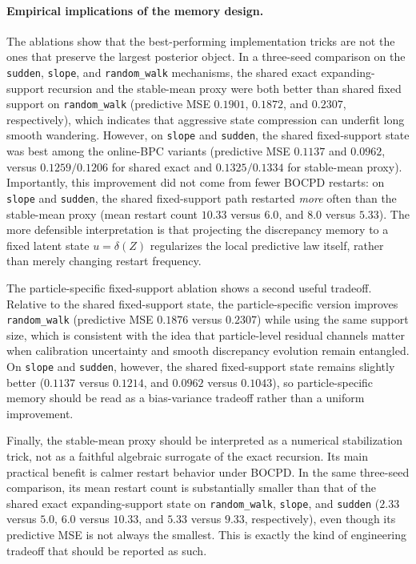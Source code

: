 \documentclass{article}
\begin{document}
\paragraph{Empirical implications of the memory design.}
The ablations show that the best-performing implementation tricks are not the ones that preserve the largest posterior object. In a three-seed comparison on the \texttt{sudden}, \texttt{slope}, and \texttt{random\_walk} mechanisms, the shared exact expanding-support recursion and the stable-mean proxy were both better than shared fixed support on \texttt{random\_walk} (predictive MSE $0.1901$, $0.1872$, and $0.2307$, respectively), which indicates that aggressive state compression can underfit long smooth wandering. However, on \texttt{slope} and \texttt{sudden}, the shared fixed-support state was best among the online-BPC variants (predictive MSE $0.1137$ and $0.0962$, versus $0.1259/0.1206$ for shared exact and $0.1325/0.1334$ for stable-mean proxy). Importantly, this improvement did not come from fewer BOCPD restarts: on \texttt{slope} and \texttt{sudden}, the shared fixed-support path restarted \emph{more} often than the stable-mean proxy (mean restart count $10.33$ versus $6.0$, and $8.0$ versus $5.33$). The more defensible interpretation is that projecting the discrepancy memory to a fixed latent state $u=\delta(Z)$ regularizes the local predictive law itself, rather than merely changing restart frequency.

The particle-specific fixed-support ablation shows a second useful tradeoff. Relative to the shared fixed-support state, the particle-specific version improves \texttt{random\_walk} (predictive MSE $0.1876$ versus $0.2307$) while using the same support size, which is consistent with the idea that particle-level residual channels matter when calibration uncertainty and smooth discrepancy evolution remain entangled. On \texttt{slope} and \texttt{sudden}, however, the shared fixed-support state remains slightly better ($0.1137$ versus $0.1214$, and $0.0962$ versus $0.1043$), so particle-specific memory should be read as a bias-variance tradeoff rather than a uniform improvement.

Finally, the stable-mean proxy should be interpreted as a numerical stabilization trick, not as a faithful algebraic surrogate of the exact recursion. Its main practical benefit is calmer restart behavior under BOCPD. In the same three-seed comparison, its mean restart count is substantially smaller than that of the shared exact expanding-support state on \texttt{random\_walk}, \texttt{slope}, and \texttt{sudden} ($2.33$ versus $5.0$, $6.0$ versus $10.33$, and $5.33$ versus $9.33$, respectively), even though its predictive MSE is not always the smallest. This is exactly the kind of engineering tradeoff that should be reported as such.
\end{document}
